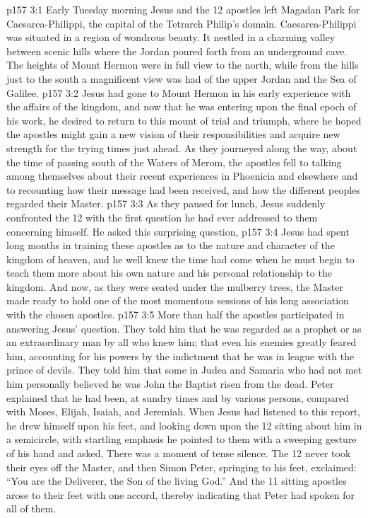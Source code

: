 \vs p157 3:1 Early Tuesday morning Jesus and the 12 apostles left Magadan Park for Caesarea\hyp{}Philippi, the capital of the Tetrarch Philip’s domain. Caesarea\hyp{}Philippi was situated in a region of wondrous beauty. It nestled in a charming valley between scenic hills where the Jordan poured forth from an underground cave. The heights of Mount Hermon were in full view to the north, while from the hills just to the south a magnificent view was had of the upper Jordan and the Sea of Galilee.
\vs p157 3:2 Jesus had gone to Mount Hermon in his early experience with the affairs of the kingdom, and now that he was entering upon the final epoch of his work, he desired to return to this mount of trial and triumph, where he hoped the apostles might gain a new vision of their responsibilities and acquire new strength for the trying times just ahead. As they journeyed along the way, about the time of passing south of the Waters of Merom, the apostles fell to talking among themselves about their recent experiences in Phoenicia and elsewhere and to recounting how their message had been received, and how the different peoples regarded their Master.
\vs p157 3:3 As they paused for lunch, Jesus suddenly confronted the 12 with the first question he had ever addressed to them concerning himself. He asked this surprising question, 
\vs p157 3:4 \pc Jesus had spent long months in training these apostles as to the nature and character of the kingdom of heaven, and he well knew the time had come when he must begin to teach them more about his own nature and his personal relationship to the kingdom. And now, as they were seated under the mulberry trees, the Master made ready to hold one of the most momentous sessions of his long association with the chosen apostles.
\vs p157 3:5 \pc More than half the apostles participated in answering Jesus’ question. They told him that he was regarded as a prophet or as an extraordinary man by all who knew him; that even his enemies greatly feared him, accounting for his powers by the indictment that he was in league with the prince of devils. They told him that some in Judea and Samaria who had not met him personally believed he was John the Baptist risen from the dead. Peter explained that he had been, at sundry times and by various persons, compared with Moses, Elijah, Isaiah, and Jeremiah. When Jesus had listened to this report, he drew himself upon his feet, and looking down upon the 12 sitting about him in a semicircle, with startling emphasis he pointed to them with a sweeping gesture of his hand and asked,  There was a moment of tense silence. The 12 never took their eyes off the Master, and then Simon Peter, springing to his feet, exclaimed: “You are the Deliverer, the Son of the living God.” And the 11 sitting apostles arose to their feet with one accord, thereby indicating that Peter had spoken for all of them.
